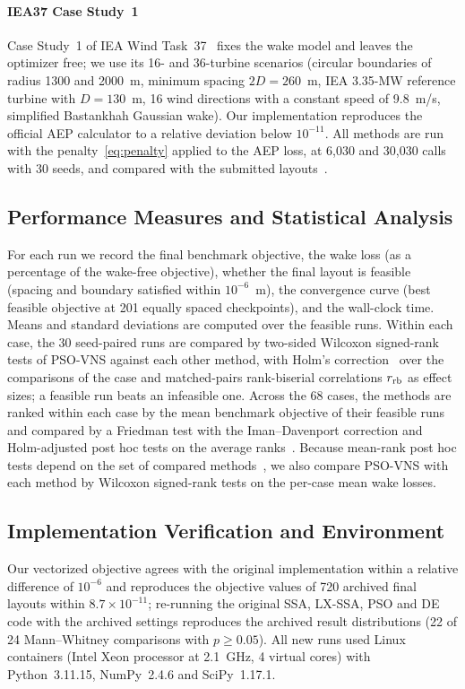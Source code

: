 \documentclass[journal,twoside]{IEEEtran}
\begin{document}
\paragraph*{IEA37 Case Study~1} Case Study~1 of IEA Wind Task~37~\cite{Baker2019,IEA37repo} fixes the wake model and leaves the optimizer free; we use its 16- and 36-turbine scenarios (circular boundaries of radius 1300 and 2000~m, minimum spacing $2D=260$~m, IEA 3.35-MW reference turbine with $D=130$~m, 16 wind directions with a constant speed of 9.8~m/s, simplified Bastankhah Gaussian wake). Our implementation reproduces the official AEP calculator to a relative deviation below $10^{-11}$. All methods are run with the penalty~\eqref{eq:penalty} applied to the AEP loss, at 6,030 and 30,030 calls with 30 seeds, and compared with the submitted layouts~\cite{Baker2019,IEA37repo}.

\subsection{Performance Measures and Statistical Analysis}
For each run we record the final benchmark objective, the wake loss (as a percentage of the wake-free objective), whether the final layout is feasible (spacing and boundary satisfied within $10^{-6}$~m), the convergence curve (best feasible objective at 201 equally spaced checkpoints), and the wall-clock time. Means and standard deviations are computed over the feasible runs. Within each case, the 30 seed-paired runs are compared by two-sided Wilcoxon signed-rank tests of PSO-VNS against each other method, with Holm's correction~\cite{Holm1979} over the comparisons of the case and matched-pairs rank-biserial correlations $r_{\rm rb}$ as effect sizes; a feasible run beats an infeasible one. Across the 68 cases, the methods are ranked within each case by the mean benchmark objective of their feasible runs and compared by a Friedman test with the Iman--Davenport correction and Holm-adjusted post hoc tests on the average ranks~\cite{Demsar2006}. Because mean-rank post hoc tests depend on the set of compared methods~\cite{Benavoli2016}, we also compare PSO-VNS with each method by Wilcoxon signed-rank tests on the per-case mean wake losses.

\subsection{Implementation Verification and Environment}
\label{sec:validation}
Our vectorized objective agrees with the original implementation within a relative difference of $10^{-6}$ and reproduces the objective values of 720 archived final layouts within $8.7\times10^{-11}$; re-running the original SSA, LX-SSA, PSO and DE code with the archived settings reproduces the archived result distributions (22 of 24 Mann--Whitney comparisons with $p\ge0.05$). All new runs used Linux containers (Intel Xeon processor at 2.1~GHz, 4 virtual cores) with Python~3.11.15, NumPy~2.4.6 and SciPy~1.17.1.
\end{document}
